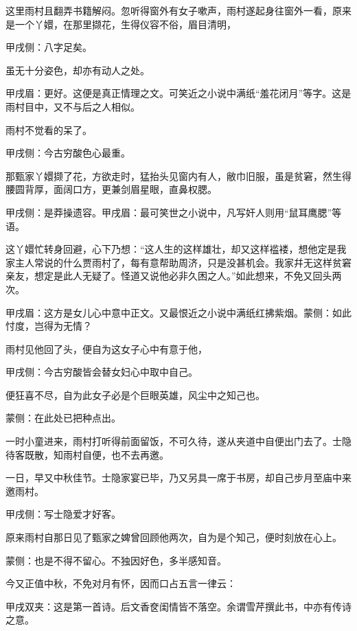 \begin{parag}
    这里雨村且翻弄书籍解闷。忽听得窗外有女子嗽声，雨村遂起身往窗外一看，原来是一个丫嬛，在那里撷花，生得仪容不俗，眉目清明，\begin{note}甲戌侧：八字足矣。\end{note}虽无十分姿色，却亦有动人之处。\begin{note}甲戌眉：更好。这便是真正情理之文。可笑近之小说中满纸“羞花闭月”等字。这是雨村目中，又不与后之人相似。\end{note}雨村不觉看的呆了。\begin{note}甲戌侧：今古穷酸色心最重。\end{note}那甄家丫嬛撷了花，方欲走时，猛抬头见窗内有人，敝巾旧服，虽是贫窘，然生得腰圆背厚，面阔口方，更兼剑眉星眼，直鼻权腮。\begin{note}甲戌侧：是莽操遗容。甲戌眉：最可笑世之小说中，凡写奸人则用“鼠耳鹰腮”等语。\end{note}这丫嬛忙转身回避，心下乃想：“这人生的这样雄壮，却又这样褴褛，想他定是我家主人常说的什么贾雨村了，每有意帮助周济，只是没甚机会。我家幷无这样贫窘亲友，想定是此人无疑了。怪道又说他必非久困之人。”如此想来，不免又回头两次。\begin{note}甲戌眉：这方是女儿心中意中正文。又最恨近之小说中满纸红拂紫烟。蒙侧：如此忖度，岂得为无情？\end{note}雨村见他回了头，便自为这女子心中有意于他，\begin{note}甲戌侧：今古穷酸皆会替女妇心中取中自己。\end{note}便狂喜不尽，自为此女子必是个巨眼英雄，风尘中之知己也。\begin{note}蒙侧：在此处已把种点出。\end{note}一时小童进来，雨村打听得前面留饭，不可久待，遂从夹道中自便出门去了。士隐待客既散，知雨村自便，也不去再邀。
\end{parag}


\begin{parag}
    一日，早又中秋佳节。士隐家宴已毕，乃又另具一席于书房，却自己步月至庙中来邀雨村。\begin{note}甲戌侧：写士隐爱才好客。\end{note}原来雨村自那日见了甄家之婢曾回顾他两次，自为是个知己，便时刻放在心上。\begin{note}蒙侧：也是不得不留心。不独因好色，多半感知音。\end{note}今又正值中秋，不免对月有怀，因而口占五言一律云：\begin{note}甲戌双夹：这是第一首诗。后文香奁闺情皆不落空。余谓雪芹撰此书，中亦有传诗之意。\end{note}
\end{parag}


